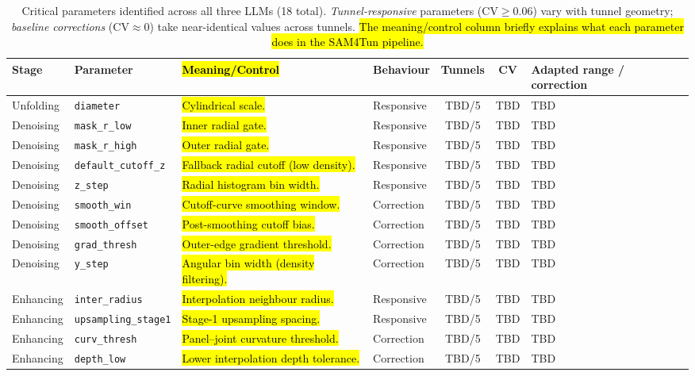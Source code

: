\documentclass[a4paper,fleqn]{cas-dc}
\begin{document}
{\begin{table}[t]
\caption{Critical parameters identified across all three LLMs (18 total). \emph{Tunnel-responsive} parameters ($\text{CV} \geq 0.06$) vary with tunnel geometry; \emph{baseline corrections} ($\text{CV} \approx 0$) take near-identical values across tunnels. \hl{The meaning/control column briefly explains what each parameter does in the SAM4Tun pipeline.}}\label{tab:critical-params}
\begin{tabular*}{\textwidth}{@{\extracolsep{\fill}} l l p{} l c c l @{}}
\toprule
Stage & Parameter & \hl{Meaning/Control} & Behaviour & Tunnels & CV & Adapted range / correction \\
\midrule
Unfolding & \texttt{diameter} & \hl{Cylindrical scale.} & Responsive & TBD/5 & TBD & TBD \\
\midrule
Denoising & \texttt{mask\_r\_low} & \hl{Inner radial gate.} & Responsive & TBD/5 & TBD & TBD \\
Denoising & \texttt{mask\_r\_high} & \hl{Outer radial gate.} & Responsive & TBD/5 & TBD & TBD \\
Denoising & \texttt{default\_cutoff\_z} & \hl{Fallback radial cutoff (low density).} & Responsive & TBD/5 & TBD & TBD \\
Denoising & \texttt{z\_step} & \hl{Radial histogram bin width.} & Responsive & TBD/5 & TBD & TBD \\
Denoising & \texttt{smooth\_win} & \hl{Cutoff-curve smoothing window.} & Correction & TBD/5 & TBD & TBD \\
Denoising & \texttt{smooth\_offset} & \hl{Post-smoothing cutoff bias.} & Correction & TBD/5 & TBD & TBD \\
Denoising & \texttt{grad\_thresh} & \hl{Outer-edge gradient threshold.} & Correction & TBD/5 & TBD & TBD \\
Denoising & \texttt{y\_step} & \hl{Angular bin width (density filtering).} & Correction & TBD/5 & TBD & TBD \\
\midrule
Enhancing & \texttt{inter\_radius} & \hl{Interpolation neighbour radius.} & Responsive & TBD/5 & TBD & TBD \\
Enhancing & \texttt{upsampling\_stage1} & \hl{Stage-1 upsampling spacing.} & Responsive & TBD/5 & TBD & TBD \\
Enhancing & \texttt{curv\_thresh} & \hl{Panel--joint curvature threshold.} & Correction & TBD/5 & TBD & TBD \\
Enhancing & \texttt{depth\_low} & \hl{Lower interpolation depth tolerance.} & Correction & TBD/5 & TBD & TBD \\

\end{tabular*}
\end{table}}
\end{document}
